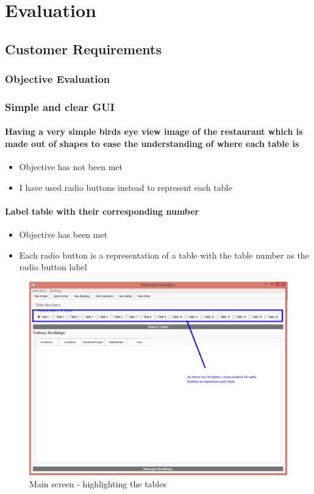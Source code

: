 \chapter{Evaluation}

\section{Customer Requirements}

\subsection{Objective Evaluation}

\subsection{Simple and clear GUI}

\subsubsection{Having a very simple birds eye view image of the restaurant which is made out of shapes to ease the understanding of where each table is}
\begin{itemize}
	\item Objective has not been met
	\item I have used radio buttons instead to represent each table
\end{itemize}

\subsubsection{Label table with their corresponding number}
\begin{itemize}
	\item Objective has been met
	\item Each radio button is a representation of a table with the table number as the radio button label
\end{itemize}

\begin{figure}[H]
    \includegraphics[width=\textwidth]{./Evaluation/images/radioButton}
    \caption{Main screen - highlighting the tables} \label{fig:radioButton}
\end{figure}

